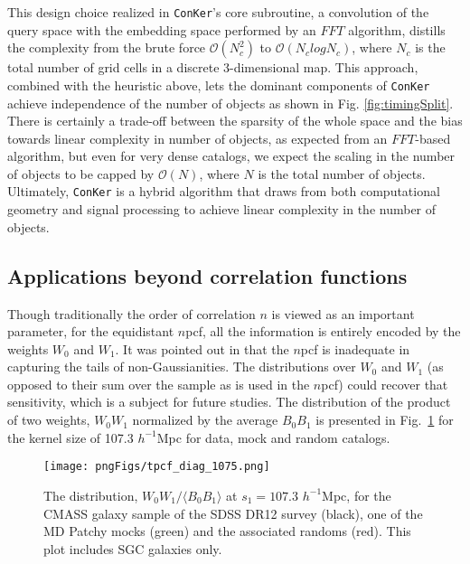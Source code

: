 \documentclass{aa}
\begin{document}
This design choice realized in {\tt ConKer}'s core subroutine, a convolution of the query space with the embedding space performed by an $FFT$ algorithm, distills the complexity from the brute force $\mathcal{O}(N_c^2)$ to  
$\mathcal{O}(N_clogN_c)$, where $N_c$ is the total number of grid cells in a discrete 3-dimensional map. This approach, combined with the heuristic above, lets the dominant components of {\tt ConKer} achieve independence of the number of objects as shown in Fig. \ref{fig:timingSplit}. There is certainly a trade-off between the sparsity of the whole space and the bias towards linear complexity in number of objects, as expected from an $FFT$-based algorithm, but even for very dense catalogs, we expect the scaling in the number of objects to be capped by $\mathcal{O}(N)$, where $N$ is the total number of objects. Ultimately, {\tt ConKer} is a hybrid algorithm that draws from both computational geometry and signal processing to achieve linear complexity in the number of objects.

\subsection{Applications beyond correlation functions}

Though traditionally the order of correlation $n$ is viewed as an important parameter, for the equidistant $n$pcf, all the information is entirely encoded by the weights $W_0$ and $W_1$. It was pointed out in \cite{carron2012} that the $n$pcf is inadequate in capturing the tails of non-Gaussianities. The distributions over $W_0$ and $W_1$ (as opposed to their sum over the sample as is used in the $n$pcf) could recover that sensitivity, which is a subject for future studies. The distribution of the product of two weights,  $W_0W_1$ normalized by the average $B_0B_1$ is presented in Fig.~\ref{fig:wishbone} for the kernel size of 107.3 $h^{-1}$Mpc for data, mock and random catalogs. 

\begin{figure}
\texttt{[image: pngFigs/tpcf\_diag\_1075.png]}
\caption{The distribution, $W_0 W_1 / \langle B_0 B_1 \rangle$ at $s_1 = 107.3$ $h^{-1}$Mpc, for the CMASS galaxy sample of the SDSS DR12 survey (black), one of the MD Patchy mocks (green) and the associated randoms (red). This plot includes SGC galaxies only.}
\label{fig:wishbone}
\end{figure}
\end{document}
